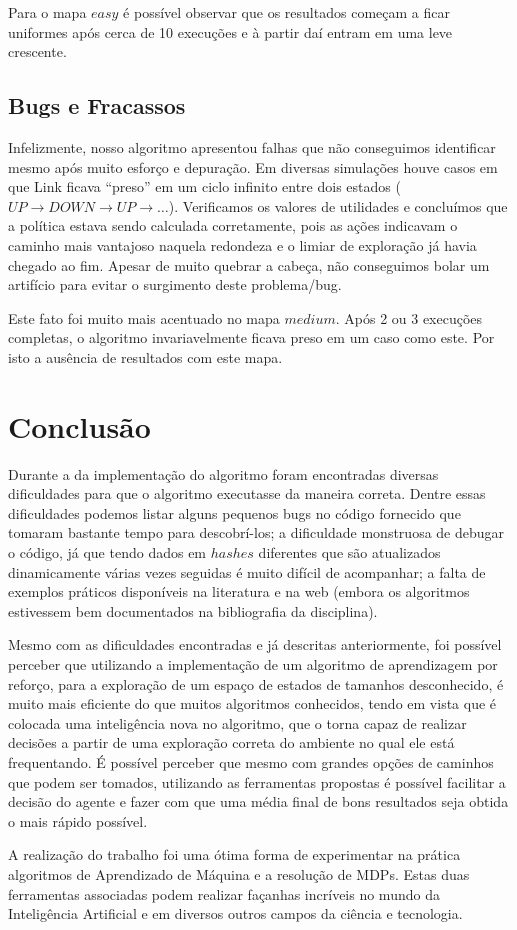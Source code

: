 \documentclass[letterpaper]{article}
\begin{document}
Para o mapa $easy$ é possível observar que os resultados começam a ficar uniformes após cerca de 10 execuções e à partir daí entram em uma leve crescente.

\subsection{Bugs e Fracassos}

Infelizmente, nosso algoritmo apresentou falhas que não conseguimos identificar mesmo após muito esforço e depuração. Em diversas simulações houve casos
em que Link ficava ``preso'' em um ciclo infinito entre dois estados ($UP \rightarrow DOWN \rightarrow UP \rightarrow \ldots$). Verificamos os valores de
utilidades e concluímos que a política estava sendo calculada corretamente, pois as ações indicavam o caminho mais vantajoso naquela redondeza e o limiar
de exploração já havia chegado ao fim. Apesar de muito quebrar a cabeça, não conseguimos bolar um artifício para evitar o surgimento deste problema/bug.

Este fato foi muito mais acentuado no mapa $medium$. Após 2 ou 3 execuções completas, o algoritmo invariavelmente ficava preso em um caso como este. Por
isto a ausência de resultados com este mapa.

\section{Conclusão}

Durante a da implementação do algoritmo foram encontradas diversas dificuldades para que o algoritmo executasse da maneira correta. Dentre essas dificuldades
podemos listar alguns pequenos bugs no código fornecido que tomaram bastante tempo para descobrí-los; a dificuldade monstruosa de debugar o código, já que
tendo dados em $hashes$ diferentes que são atualizados dinamicamente várias vezes seguidas é muito difícil de acompanhar; a falta de exemplos práticos disponíveis
na literatura e na web (embora os algoritmos estivessem bem documentados na bibliografia da disciplina).

Mesmo com as dificuldades encontradas e já descritas anteriormente, foi possível perceber que utilizando a implementação de um algoritmo de
aprendizagem por reforço, para a exploração de um espaço de estados de tamanhos desconhecido, é muito mais eficiente do que muitos algoritmos conhecidos,
tendo em vista que é colocada uma inteligência nova no algoritmo, que o torna capaz de realizar decisões a partir de uma exploração correta do ambiente no
qual ele está frequentando. É possível perceber que mesmo com grandes opções de caminhos que podem ser tomados, utilizando as ferramentas propostas é possível
facilitar a decisão do agente e fazer com que uma média final de bons resultados seja obtida o mais rápido possível.

A realização do trabalho foi uma ótima forma de experimentar na prática algoritmos de Aprendizado de Máquina e a resolução de MDPs. Estas duas
ferramentas associadas podem realizar façanhas incríveis no mundo da Inteligência Artificial e em diversos outros campos da ciência e tecnologia.
\end{document}
